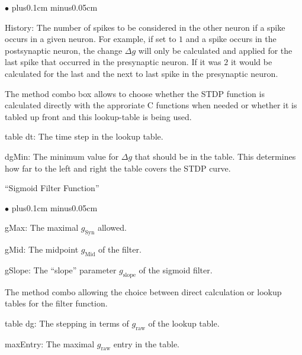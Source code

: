 \documentclass{article}
\newenvironment{myitem}{\begin{list}{$\bullet$}{\setlength{\leftmargin}{1.1em}
\itemsep0.1cm plus0.1cm minus0.05cm
\listparindent0cm
\addtolength{\labelsep}{0.5\labelsep}
\setlength{\labelwidth}{0.8em}
\setlength{\leftmargin}{\labelwidth}
\addtolength{\leftmargin}{\labelsep}
}}{\end{list}}
\begin{document}
\begin{myitem}
\item History: The number of spikes to be considered in the other
  neuron if a spike occurs in a given neuron. For example, if set to
  $1$ and a spike occurs in the postsynaptic neuron, the change 
  $\Delta g$ will only be calculated and applied for the last spike
  that occurred in the presynaptic neuron. If it was $2$ it would be
  calculated for the last and the next to last spike in the
  presynaptic neuron.
\item The method combo box allows to choose whether the STDP function is
  calculated directly with the approriate C functions when needed or
  whether it is tabled up front and this lookup-table is being used.
\item table dt: The time step in the lookup table.
\item dgMin: The minimum value for $\Delta g$ that should be in the
  table. This determines how far to the left and right the table
  covers the STDP curve.
\end{myitem}
``Sigmoid Filter Function''
\begin{myitem}
\item gMax: The maximal $g_{\text{Syn}}$ allowed.
\item gMid: The midpoint $g_{\text{Mid}}$ of the filter.
\item gSlope: The ``slope'' parameter $g_{\text{slope}}$ of the sigmoid filter. 
\item The method combo allowing the choice between direct calculation
  or lookup tables for the filter function.
\item table dg: The stepping in terms of $g_{\text{raw}}$ of the
  lookup table.
\item maxEntry: The maximal $g_{\text{raw}}$ entry in the table.
\end{myitem}
\end{document}
